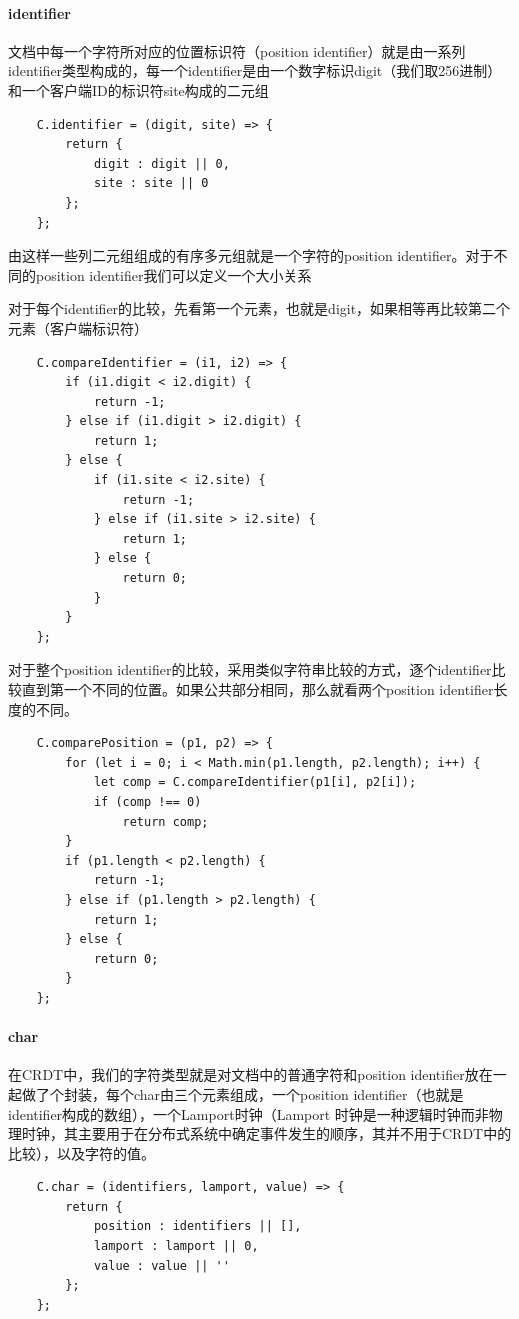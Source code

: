 \documentclass[11pt]{ctexart}
\begin{document}
\paragraph{\textsf{identifier}}
文档中每一个字符所对应的位置标识符（position identifier）就是由一系列identifier类型构成的，每一个identifier是由一个数字标识digit（我们取256进制）和一个客户端ID的标识符site构成的二元组
\begin{verbatim}
    C.identifier = (digit, site) => {
        return {
            digit : digit || 0,
            site : site || 0
        };
    };
\end{verbatim}

由这样一些列二元组组成的有序多元组就是一个字符的position identifier。对于不同的position identifier我们可以定义一个大小关系

对于每个identifier的比较，先看第一个元素，也就是digit，如果相等再比较第二个元素（客户端标识符）
\begin{verbatim}
    C.compareIdentifier = (i1, i2) => {
        if (i1.digit < i2.digit) {
            return -1;
        } else if (i1.digit > i2.digit) {
            return 1;
        } else {
            if (i1.site < i2.site) {
                return -1;
            } else if (i1.site > i2.site) {
                return 1;
            } else {
                return 0;
            }
        }
    };
\end{verbatim}

对于整个position identifier的比较，采用类似字符串比较的方式，逐个identifier比较直到第一个不同的位置。如果公共部分相同，那么就看两个position identifier长度的不同。
\begin{verbatim}
    C.comparePosition = (p1, p2) => {
        for (let i = 0; i < Math.min(p1.length, p2.length); i++) {
            let comp = C.compareIdentifier(p1[i], p2[i]);
            if (comp !== 0)
                return comp;
        }
        if (p1.length < p2.length) {
            return -1;
        } else if (p1.length > p2.length) {
            return 1;
        } else {
            return 0;
        }
    };
\end{verbatim}

\paragraph{\textsf{char}} 在CRDT中，我们的字符类型就是对文档中的普通字符和position identifier放在一起做了个封装，每个char由三个元素组成，一个position identifier（也就是identifier构成的数组），一个Lamport时钟（Lamport
时钟是一种逻辑时钟而非物理时钟，其主要用于在分布式系统中确定事件发生的顺序，其并不用于CRDT中的比较），以及字符的值。
\begin{verbatim}
    C.char = (identifiers, lamport, value) => {
        return {
            position : identifiers || [],
            lamport : lamport || 0,
            value : value || ''
        };
    };
\end{verbatim}
\end{document}
